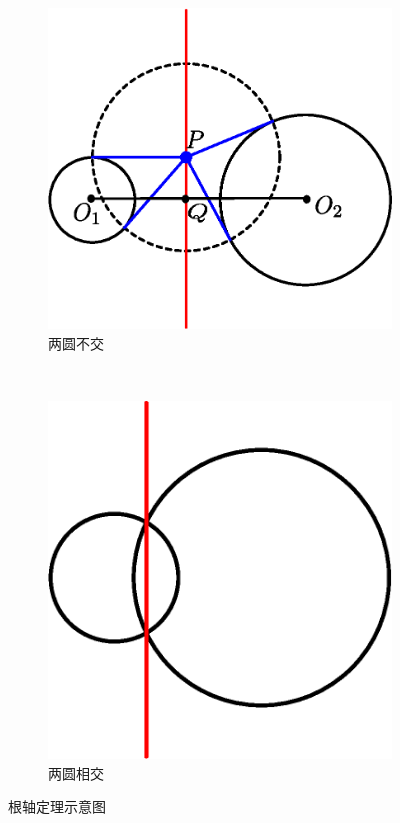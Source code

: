 \documentclass[12pt]{article}
\begin{document}
\begin{enumerate}
    \begin{figure}[!ht]
    \centering
    \begin{subfigure}[b]{0.45\textwidth}
    \includegraphics[width=\textwidth]{Radical_axis_orthogonal_circles.eps}
    \caption{两圆不交}\label{fig:Radical_axis_orthogonal_circles}
    \end{subfigure}~
    \begin{subfigure}[b]{0.45\textwidth}
    \includegraphics[width=\textwidth]{Radical_axis_intersecting_circles.eps}
    \caption{两圆相交}\label{fig:Radical_axis_intersecting_circles}
    \end{subfigure}
    \caption{根轴定理示意图}
    \end{figure}


\end{enumerate}
\end{document}
